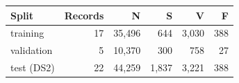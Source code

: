 \begin{tabular}{lrrrrr}
\toprule
Split & Records & N & S & V & F \\
\midrule
training & 17 & 35,496 & 644 & 3,030 & 388 \\
validation & 5 & 10,370 & 300 & 758 & 27 \\
test (DS2) & 22 & 44,259 & 1,837 & 3,221 & 388 \\
\bottomrule
\end{tabular}

